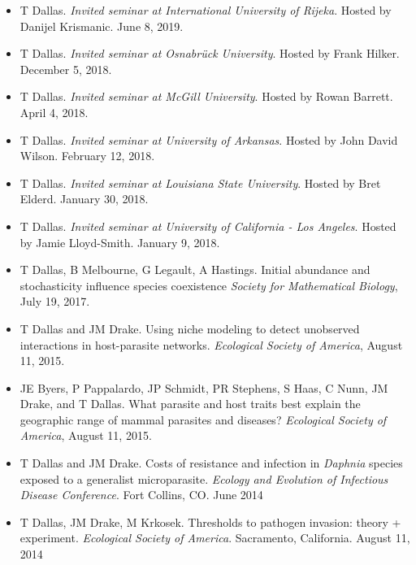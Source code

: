 \documentclass[]{CV}
\begin{document}
\begin{itemize}

\item {\mefont T Dallas}. \textit{Invited seminar at International University of Rijeka}. Hosted by Danijel Krismanic. June 8, 2019.

\item {\mefont T Dallas}. \textit{Invited seminar at Osnabr\"uck University}. Hosted by Frank Hilker. December 5, 2018.

\item {\mefont T Dallas}. \textit{Invited seminar at McGill University}. Hosted by Rowan Barrett. April 4, 2018. 

\item {\mefont T Dallas}. \textit{Invited seminar at University of Arkansas}. Hosted by John David Wilson. February 12, 2018. 

\item {\mefont T Dallas}. \textit{Invited seminar at Louisiana State University}. Hosted by Bret Elderd. January 30, 2018. 

\item {\mefont T Dallas}. \textit{Invited seminar at University of California - Los Angeles}. Hosted by Jamie Lloyd-Smith. January 9, 2018. 

\item {\mefont T Dallas}, B Melbourne, G Legault, A Hastings. Initial abundance and stochasticity influence species coexistence \textit{Society for Mathematical Biology}, July 19, 2017.

\item {\mefont T Dallas} and JM Drake. Using niche modeling to detect unobserved interactions in host-parasite networks. \textit{Ecological Society of America}, August 11, 2015.

\item JE Byers, P Pappalardo, JP Schmidt, PR Stephens, S Haas, C Nunn, JM Drake, and {\mefont T Dallas}. What parasite and host traits best explain the geographic range of mammal parasites and diseases? \textit{Ecological Society of America}, August 11, 2015.

\item {\mefont T Dallas} and JM Drake. Costs of resistance and infection in \textit{Daphnia} species exposed to a generalist microparasite. \textit{Ecology and Evolution of Infectious Disease Conference}. Fort Collins, CO. June 2014

\item  {\mefont T Dallas}, JM Drake, M Krkosek. Thresholds to pathogen invasion: theory + experiment. \textit{Ecological Society of America}. Sacramento, California. August 11, 2014


\end{itemize}
\end{document}
